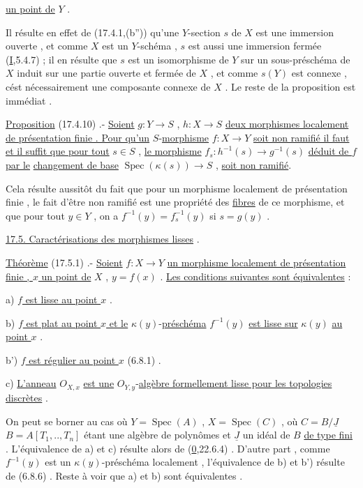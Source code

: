 \uline{un point de} $Y$ .

Il résulte en effet de (17.4.1,(b'')) qu'une $Y$-section $s$ de $X$ est une
immersion ouverte , et comme $X$ est un $Y$-schéma , $s$ est aussi une 
immersion fermée (\uline{I},5.4.7) ; il en résulte que $s$ est un isomorphisme de
$Y$ sur un sous-préschéma de $X$ induit sur une partie ouverte et fermée de
$X$ , et comme  $s(Y)$ est connexe , cést nécessairement une composante
connexe de $X$ . Le reste de la proposition est immédiat .

\handwritten{[}\uline{Proposition} (17.4.10) .- \uline{Soient} $g:Y\to S$ , $h:X\to S$ \uline{deux morphismes localement de présentation finie . Pour qu'un} $S$-\uline{morphisme} $f:X\to Y$ \uline{soit non ramifié
il faut et il suffit que pour tout} $s\in S$ , \uline{le morphisme} $f_s:h^{-1}(s)\to g^{-1}(s)$
\uline{déduit de $f$ par le}  \uline{changement de base} $\operatorname{Spec}(\kappa(s))\to S$ , \uline{soit non ramifié}.

Cela résulte aussitôt du fait que pour un morphisme localement de présentation finie , le fait d'être non ramifié est une propriété des \uline{fibres} de ce
morphisme, et  que pour tout $y\in Y$ , on a $f^{-1}(y)=f_s^{-1}(y)$ si $s=g(y)$ .\handwritten{]}

\uline{17.5. Caractérisations des morphismes lisses} .

\uline{Théorème} (17.5.1) .- \uline{Soient} $f:X\to Y$ \uline{un morphisme localement de présentation finie , $x$ un point de} $X$ , $y=f(x)$ . \uline{Les conditions suivantes sont équivalentes} :

a) \uline{$f$ est lisse au point $x$} .

b) \uline{$f$ est plat au point $x$ et le} $\kappa(y)$-\uline{préschéma} $f^{-1}(y)$ \uline{est lisse sur} $\kappa(y)$
\uline{au point $x$} .

b') \uline{$f$ est régulier au point $x$} (6.8.1) .

c) \uline{L'anneau} $O_{X,x}$ \uline{est une} $O_{Y,y}$-\uline{algèbre formellement lisse pour les topologies discrètes} .

On peut se borner au cas où $Y=\operatorname{Spec}(A)$ ,  $X=\operatorname{Spec}(C)$ , où $C=B/\underline J$
$B=A[T_1,..,T_n]$ étant une algèbre de polynômes et $\underline J$ un idéal de $B$ \uline{de type fini} . L'équivalence de a) et c) résulte alors de (\uline{0},22.6.4) . D'autre
part , comme $f^{-1}(y)$ est un $\kappa(y)$-préschéma localement  , l'équivalence de b) et b') résulte de (6.8.6) . Reste à voir que a) et b)
sont équivalentes .
